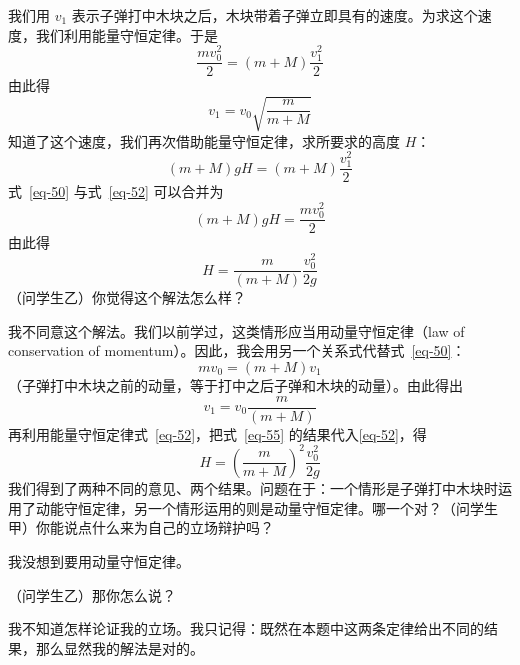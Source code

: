 \begin{dialogue}
\stda 我们用 $v_{1}$ 表示子弹打中木块之后，木块带着子弹立即具有的速度。为求这个速度，我们利用能量守恒定律。于是
\begin{equation}%
\frac{m v_{0}^{2}}{2} = \left( m + M \right) \frac{v_{1}^{2}}{2}
\label{eq-50}
\end{equation}
由此得
\begin{equation}%
v_{1} = v_{0} \sqrt{\frac{m}{ m + M}}
\label{eq-51}
\end{equation}
知道了这个速度，我们再次借助能量守恒定律，求所要求的高度 $H$：
\begin{equation}%
(m+ M) gH = (m + M) \frac{v_{1}^{2}}{2}
\label{eq-52}
\end{equation}
式~\eqref{eq-50} 与式~\eqref{eq-52} 可以合并为
\begin{equation*}%
(m+ M) gH = \frac{mv_{0}^{2}}{2}
\end{equation*}
由此得
\begin{equation}%
H = \frac{m}{(m + M)} \frac{v_{0}^{2}}{2g}
\label{eq-53}
\end{equation}
\tchr （问学生乙）你觉得这个解法怎么样？

\stdb 我不同意这个解法。我们以前学过，这类情形应当用动量守恒定律（law of conservation of momentum）。因此，我会用另一个关系式代替式~\eqref{eq-50}：
\begin{equation}%
mv_{0} = (m+M) v_{1}
\label{eq-54}
\end{equation}
（子弹打中木块之前的动量，等于打中之后子弹和木块的动量）。由此得出
\begin{equation}%
v_{1} = v_{0} \frac{m}{(m + M)}
\label{eq-55}
\end{equation}
再利用能量守恒定律式~\eqref{eq-52}，把式~\eqref{eq-55} 的结果代入\eqref{eq-52}，得
\begin{equation}%
H = \left(\frac{m}{m + M} \right)^{2} \frac{v_{0}^{2}}{2g}
\label{eq-56}
\end{equation}
\tchr 我们得到了两种不同的意见、两个结果。问题在于：一个情形是子弹打中木块时运用了动能守恒定律，另一个情形运用的则是动量守恒定律。哪一个对？（问学生甲）你能说点什么来为自己的立场辩护吗？

\stda 我没想到要用动量守恒定律。

\tchr （问学生乙）那你怎么说？

\stdb 我不知道怎样论证我的立场。我只记得：既然在本题中这两条定律给出不同的结果，那么显然我的解法是对的。


\end{dialogue}
